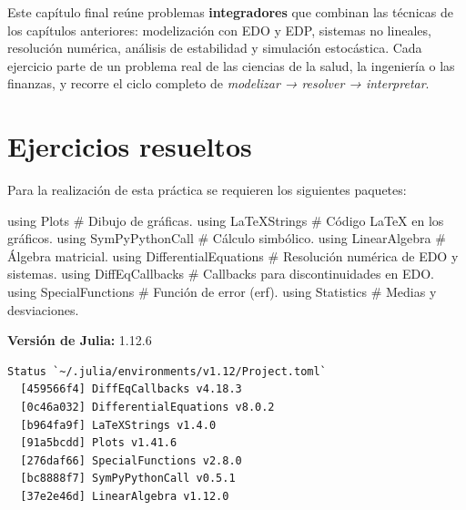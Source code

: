 \documentclass[
  spanish,
  a4paper,
]{scrreport}
\newenvironment{Shaded}{\begin{snugshade}}{\end{snugshade}}
\newcommand{\BuiltInTok}[1]{\textcolor[rgb]{0.00,0.23,0.31}{#1}}
\newcommand{\CommentTok}[1]{\textcolor[rgb]{0.37,0.37,0.37}{#1}}
\newcommand{\ImportTok}[1]{\textcolor[rgb]{0.00,0.46,0.62}{#1}}
\theoremstyle{definition}
\theoremstyle{remark}
\begin{document}
Este capítulo final reúne problemas \textbf{integradores} que combinan
las técnicas de los capítulos anteriores: modelización con EDO y EDP,
sistemas no lineales, resolución numérica, análisis de estabilidad y
simulación estocástica. Cada ejercicio parte de un problema real de las
ciencias de la salud, la ingeniería o las finanzas, y recorre el ciclo
completo de \emph{modelizar → resolver → interpretar}.

\section{Ejercicios resueltos}\label{ejercicios-resueltos-10}

Para la realización de esta práctica se requieren los siguientes
paquetes:

\begin{Shaded}
\begin{Highlighting}[]
\ImportTok{using} \BuiltInTok{Plots}                  \CommentTok{\# Dibujo de gráficas.}
\ImportTok{using} \BuiltInTok{LaTeXStrings}           \CommentTok{\# Código LaTeX en los gráficos.}
\ImportTok{using} \BuiltInTok{SymPyPythonCall}        \CommentTok{\# Cálculo simbólico.}
\ImportTok{using} \BuiltInTok{LinearAlgebra}          \CommentTok{\# Álgebra matricial.}
\ImportTok{using} \BuiltInTok{DifferentialEquations}  \CommentTok{\# Resolución numérica de EDO y sistemas.}
\ImportTok{using} \BuiltInTok{DiffEqCallbacks}        \CommentTok{\# Callbacks para discontinuidades en EDO.}
\ImportTok{using} \BuiltInTok{SpecialFunctions}       \CommentTok{\# Función de error (erf).}
\ImportTok{using} \BuiltInTok{Statistics}             \CommentTok{\# Medias y desviaciones.}
\end{Highlighting}
\end{Shaded}

\begin{tcolorbox}[enhanced jigsaw, arc=.35mm, bottomrule=.15mm, bottomtitle=1mm, breakable, colback=white, colbacktitle=quarto-callout-note-color!10!white, colframe=quarto-callout-note-color-frame, coltitle=black, left=2mm, leftrule=.75mm, opacityback=0, opacitybacktitle=0.6, rightrule=.15mm, title=\textcolor{quarto-callout-note-color}{\faInfo}\hspace{0.5em}{Versiones de Julia y de los paquetes utilizados}, titlerule=0mm, toprule=.15mm, toptitle=1mm]

\textbf{Versión de Julia:} 1.12.6

\begin{verbatim}
Status `~/.julia/environments/v1.12/Project.toml`
  [459566f4] DiffEqCallbacks v4.18.3
  [0c46a032] DifferentialEquations v8.0.2
  [b964fa9f] LaTeXStrings v1.4.0
  [91a5bcdd] Plots v1.41.6
  [276daf66] SpecialFunctions v2.8.0
  [bc8888f7] SymPyPythonCall v0.5.1
  [37e2e46d] LinearAlgebra v1.12.0
\end{verbatim}

\end{tcolorbox}
\end{document}
